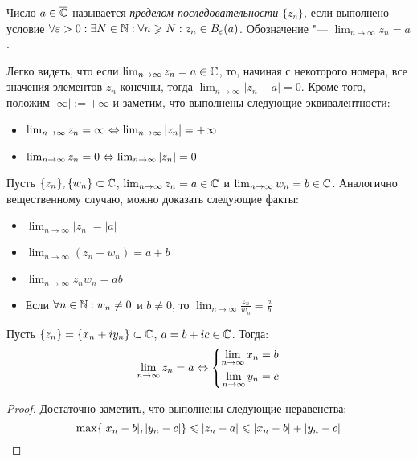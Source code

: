 \begin{definition}
	Число $a \in \overline\Cm$ называется \textit{пределом последовательности} $\{z_n\}$, если выполнено условие $\forall \epsilon > 0 : \exists N \in \N: \forall n \ge N: z_n \in B_{\epsilon}(a)$. Обозначение "--- $\lim_{n \to \infty}z_n = a$.
\end{definition}

\begin{note}
	Легко видеть, что если $\lim_{n \to \infty}z_n = a \in \Cm$, то, начиная с некоторого номера, все значения элементов $z_n$ конечны, тогда $\lim_{n \to \infty}|z_n - a| = 0$. Кроме того, положим $|\infty| := +\infty$ и заметим, что выполнены следующие эквивалентности:
	\begin{itemize}
		\item $\lim_{n \to \infty}z_n = \infty \lra \lim_{n \to \infty}|z_n| = +\infty$
		\item $\lim_{n \to \infty}z_n = 0 \lra \lim_{n \to \infty}|z_n| = 0$
	\end{itemize}
\end{note}

\begin{note}
	Пусть $\{z_n\}, \{w_n\} \subset \Cm$, $\lim_{n \to \infty}z_n = a \in \Cm$ и $\lim_{n \to \infty}w_n = b \in \Cm$. Аналогично вещественному случаю, можно доказать следующие факты:
	\begin{itemize}
		\item $\lim_{n \to \infty}|z_n| = |a|$
		\item $\lim_{n \to \infty}(z_n+w_n) = a+b$
		\item $\lim_{n \to \infty}z_nw_n = ab$
		\item Если $\forall n \in \N: w_n \ne 0$ и $b \ne 0$, то $\lim_{n \to \infty}\frac{z_n}{w_n} = \frac ab$
	\end{itemize}
\end{note}

\begin{proposition}
	Пусть $\{z_n\} = \{x_n + iy_n\} \subset \Cm$, $a = b+ic \in \Cm$. Тогда:
	\[\lim_{n \to \infty}z_n = a \lra \System{
		\lim_{n \to \infty}x_n = b\\
		\lim_{n \to \infty}y_n = c
	}\]
\end{proposition}

\begin{proof}
	Достаточно заметить, что выполнены следующие неравенства:
	\[\max\{|x_n - b|, |y_n - c|\} \le |z_n - a| \le |x_n - b| + |y_n - c|\qedhere\]
\end{proof}

